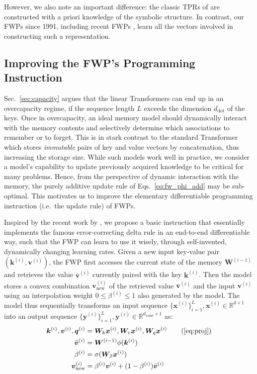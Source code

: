 \documentclass{article}
\def\vk{{\bm{k}}}
\def\vq{{\bm{q}}}
\def\vv{{\bm{v}}}
\def\vx{{\bm{x}}}
\def\vy{{\bm{y}}}
\def\mW{{\bm{W}}}
\newcommand{\sigmoid}{\sigma}
\theoremstyle{definition}
\begin{document}
However, we also note an important difference:
the classic TPRs of \citet{smolensky1990tensor}
are constructed with a priori knowledge of the symbolic structure.
In contrast, our FWPs since 1991, including  recent FWPs \citep{schlag2018learning}, learn all the vectors involved in constructing such a representation.

\subsection{Improving the FWP's Programming Instruction}
\label{sec:updaterule}
Sec.~\ref{sec:capacity} argues that the linear Transformers
can end up in an overcapacity regime, if the sequence length $L$ exceeds the
dimension $d_\text{dot}$ of the keys.
Once in overcapacity, an ideal memory model should dynamically interact with
the memory contents and selectively determine which associations to remember or to forget.
This is in stark contrast to the standard Transformer which stores \textit{immutable}
pairs of key and value vectors by concatenation, thus increasing the storage size.
While such models work well in practice, we consider a model's capability to update previously acquired knowledge to be critical for many problems.
Hence, from the perspective of dynamic interaction with the memory, the purely additive update rule of Eqs.~\ref{eq:fw_phi_add}
may be sub-optimal.
This motivates us to improve the elementary differentiable programming instruction (i.e.~the update rule) of FWPs. 

Inspired by the recent work by \citet{schlag2020fastweightmemory}, we propose a basic instruction that essentially implements the famous error-correcting delta rule \citep{widrow1960adaptive} in an end-to-end differentiable way, such that the FWP can learn to use it wisely, through  self-invented, dynamically changing learning rates. 
Given a new input key-value pair $(\vk^{(i)}, \vv^{(i)})$,
the FWP first accesses the current state of the memory $\mW^{(i-1)}$ and retrieves the value $\bar{\vv}^{(i)}$ currently paired with the key $\vk^{(i)}$. Then the model stores
a convex combination $\vv^{(i)}_\text{new}$ of the retrieved value $\bar{\vv}^{(i)}$ and the input $\vv^{(i)}$
using an interpolation weight $0 \leq \beta^{(i)} \leq 1$ also generated by the model.
The model thus sequentially transforms an input sequence $\{ \vx^{(i)} \}_{i=1}^L, \vx^{(i)} \in \mathbb{R}^{d\times1}$
into an output sequence $\{ \vy^{(i)} \}_{i=1}^L, \vy^{(i)} \in \mathbb{R}^{d_\text{value}\times1}$ as:
\begin{align}
\vk^{(i)}, \vv^{(i)}, \vq^{(i)} &= \mW_k \vx^{(i)}, \mW_v \vx^{(i)}, \mW_q \vx^{(i)} \tag{\ref{eq:proj}} \\
\bar{\vv}^{(i)} &= \mW^{(i-1)} \phi(\vk^{(i)}) \label{eq:v_old}\\
\beta^{(i)} &= \sigmoid(\mW_\beta \vx^{(i)}) \\
\vv^{(i)}_\text{new} &= \beta^{(i)} \vv^{(i)} +(1-\beta^{(i)}) \bar{\vv}^{(i)}  \label{eq:v_new}
\end{align}
\end{document}
